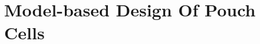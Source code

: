 
\graphicspath{{chapters/layer_opt/figures/}}

\chapter{Model-based Design Of Pouch Cells}\label{ch:modelbaseddesign}
\vspace*{-1em}
\startcontents[chapters]

\bigskip



% 

